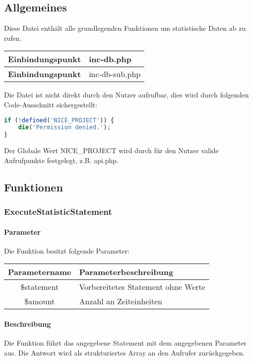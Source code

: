 \subsection{Allgemeines} Diese Datei enthält alle grundlegenden Funktionen um statistische Daten ab zu rufen.
\begin{table}[H]
	\begin{tabular}{|c|p{11cm}|}
		\hline
		\textbf{Einbindungspunkt} & inc-db.php \\ \hline
		\textbf{Einbindungspunkt} & inc-db-sub.php \\ \hline
	\end{tabular}
\end{table}
Die Datei ist nicht direkt durch den Nutzer aufrufbar, dies wird durch folgenden Code-Ausschnitt sichergestellt:
\begin{lstlisting}[language=php]
if (!defined('NICE_PROJECT')) {
	die('Permission denied.');
}
\end{lstlisting}
Der Globale Wert {\glqq NICE\_PROJECT\grqq} wird durch für den Nutzer valide Aufrufpunkte festgelegt, z.B. {\glqq api.php\grqq}.
\subsection{Funktionen}
\subsubsection{ExecuteStatisticStatement}
\paragraph{Parameter} Die Funktion besitzt folgende Parameter:
\begin{table}[H]
	\begin{tabular}{|c|p{11cm}|}
		\hline
		\textbf{Parametername} & \textbf{Parameterbeschreibung} \\ \hline
		\$statement & Vorbereitetes Statement ohne Werte \\ \hline
		\$amount    & Anzahl an Zeiteinheiten \\ \hline
	\end{tabular}
\end{table}
\paragraph{Beschreibung} Die Funktion führt das angegebene Statement mit dem angegebenen Parameter aus. Die Antwort wird als strukturiertes Array an den Aufrufer zurückgegeben.